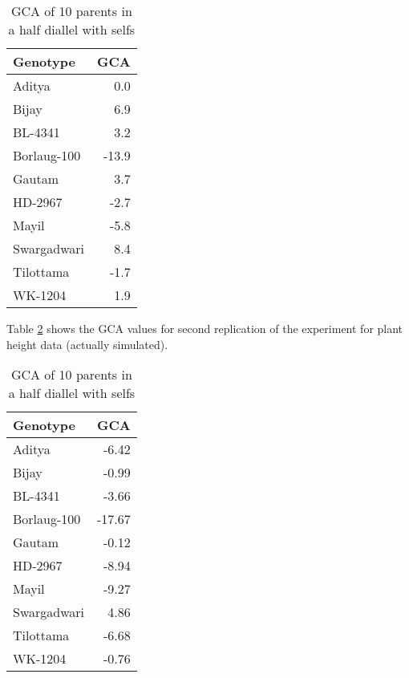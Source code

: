 \documentclass[nofonts,]{tufte-handout}
\begin{document}
\begin{table}[t]

\caption{\label{tab:half-diallel-pht-gca}GCA of 10 parents in a half diallel with selfs}
\centering
\fontsize{8}{10}\selectfont
\begin{tabular}{lr}
\toprule
Genotype & GCA\\
\midrule
\rowcolor{gray!6}  Aditya & 0.0\\
Bijay & 6.9\\
\rowcolor{gray!6}  BL-4341 & 3.2\\
Borlaug-100 & -13.9\\
\rowcolor{gray!6}  Gautam & 3.7\\
\addlinespace
HD-2967 & -2.7\\
\rowcolor{gray!6}  Mayil & -5.8\\
Swargadwari & 8.4\\
\rowcolor{gray!6}  Tilottama & -1.7\\
WK-1204 & 1.9\\
\bottomrule
\end{tabular}
\end{table}

Table \ref{tab:half-diallel-pht2-gca} shows the GCA values for second
replication of the experiment for plant height data (actually
simulated).

\begin{table}[t]

\caption{\label{tab:half-diallel-pht2-gca}GCA of 10 parents in a half diallel with selfs}
\centering
\fontsize{8}{10}\selectfont
\begin{tabular}{lr}
\toprule
Genotype & GCA\\
\midrule
\rowcolor{gray!6}  Aditya & -6.42\\
Bijay & -0.99\\
\rowcolor{gray!6}  BL-4341 & -3.66\\
Borlaug-100 & -17.67\\
\rowcolor{gray!6}  Gautam & -0.12\\
\addlinespace
HD-2967 & -8.94\\
\rowcolor{gray!6}  Mayil & -9.27\\
Swargadwari & 4.86\\
\rowcolor{gray!6}  Tilottama & -6.68\\
WK-1204 & -0.76\\
\bottomrule
\end{tabular}
\end{table}
\end{document}

